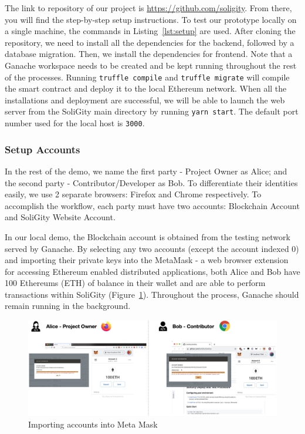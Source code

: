 \documentclass[12pt]{article}
\renewcommand{\_}{\kern-1.5pt\textunderscore\kern-1.5pt}
\begin{document}
\vspace{1em}

The link to repository of our project is \url{https://github.com/soligity}. From there, you will find the
step-by-step setup instructions. To test our prototype locally on a single machine, the commands in
Listing~\ref{lst:setup} are used. After cloning the repository, we need to install all the dependencies
for the backend, followed by a database migration.  Then, we install the dependencies for frontend. Note
that a Ganache workspace needs to be created and be kept running throughout the rest of the processes.
Running \texttt{truffle compile} and \texttt{truffle migrate} will compile the smart contract and deploy
it to the local Ethereum network. When all the installations and deployment are successful, we will be
able to launch the web server from the SoliGity main directory by running \texttt{yarn start}. The default
port number used for the local host is \texttt{3000}.

\subsubsection{Setup Accounts}
In the rest of the demo, we name the first party - Project Owner as Alice; and the second party -
Contributor/Developer as Bob. To differentiate their identities easily, we use 2 separate browsers: Firefox
and Chrome respectively. To accomplish the workflow, each party must have two accounts: Blockchain Account
and SoliGity Website Account.

In our local demo, the Blockchain account is obtained from the testing network served by Ganache. By
selecting any two accounts (except the account indexed 0) and importing their private keys into the MetaMask
- a web browser extension for accessing Ethereum enabled distributed applications, both Alice and Bob have
100 Ethereums (ETH) of balance in their wallet and are able to perform transactions within SoliGity
(Figure~\ref{fig:setup5}). Throughout the process, Ganache should remain running in the background.

\begin{figure}[H]
	\centering
	\includegraphics[width=16cm]{graphs/48. setup_3.png}
	\caption{Importing accounts into Meta Mask}
	\label{fig:setup5}
\end{figure}
\end{document}
